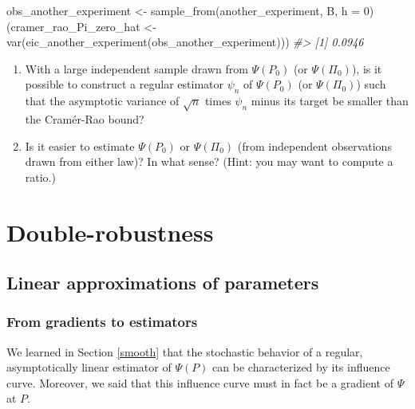 \documentclass[
  11pt,
  openright,twoside]{book}
\newenvironment{Shaded}{\begin{snugshade}}{\end{snugshade}}
\newcommand{\AttributeTok}[1]{\textcolor[rgb]{0.77,0.63,0.00}{#1}}
\newcommand{\CommentTok}[1]{\textcolor[rgb]{0.56,0.35,0.01}{\textit{#1}}}
\newcommand{\DecValTok}[1]{\textcolor[rgb]{0.00,0.00,0.81}{#1}}
\newcommand{\FunctionTok}[1]{\textcolor[rgb]{0.00,0.00,0.00}{#1}}
\newcommand{\NormalTok}[1]{#1}
\newcommand{\OtherTok}[1]{\textcolor[rgb]{0.56,0.35,0.01}{#1}}
\theoremstyle{definition}
\theoremstyle{definition}
\theoremstyle{definition}
\theoremstyle{definition}
\theoremstyle{remark}
\begin{document}
\begin{Shaded}
\begin{Highlighting}[]
\NormalTok{obs\_another\_experiment }\OtherTok{\textless{}{-}} \FunctionTok{sample\_from}\NormalTok{(another\_experiment, B, }\AttributeTok{h =} \DecValTok{0}\NormalTok{)}
\NormalTok{(cramer\_rao\_Pi\_zero\_hat }\OtherTok{\textless{}{-}}
   \FunctionTok{var}\NormalTok{(}\FunctionTok{eic\_another\_experiment}\NormalTok{(obs\_another\_experiment)))}
\CommentTok{\#\textgreater{} [1] 0.0946}
\end{Highlighting}
\end{Shaded}

\begin{enumerate}
\def\labelenumi{\arabic{enumi}.}
\setcounter{enumi}{2}
\item
  With a large independent sample drawn from \(\Psi(P_0)\) (or \(\Psi(\Pi_0)\)),
  is it possible to construct a regular estimator \(\psi_{n}\) of \(\Psi(P_0)\)
  (or \(\Psi(\Pi_0)\)) such that the asymptotic variance of \(\sqrt{n}\) times
  \(\psi_{n}\) minus its target be smaller than the Cramér-Rao bound?
\item
  Is it easier to estimate \(\Psi(P_{0})\) or \(\Psi(\Pi_{0})\) (from independent
  observations drawn from either law)? In what sense? (Hint: you may want to
  compute a ratio.)
\end{enumerate}

\hypertarget{double-robustness}{%
\chapter{Double-robustness}\label{double-robustness}}

\hypertarget{linear-approximation}{%
\section{Linear approximations of parameters}\label{linear-approximation}}

\hypertarget{from-gradients-to-estimators}{%
\subsection{From gradients to estimators}\label{from-gradients-to-estimators}}

We learned in Section \ref{smooth} that the stochastic behavior of a regular,
asymptotically linear estimator of \(\Psi(P)\) can be characterized by its
influence curve. Moreover, we said that this influence curve must in fact be a
gradient of \(\Psi\) at \(P\).
\end{document}
